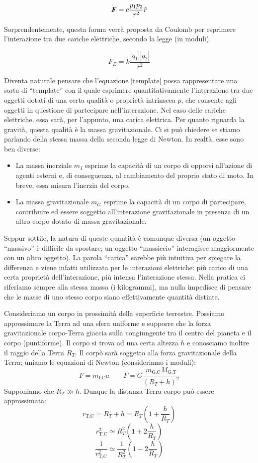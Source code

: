 \begin{align}
    \textbf{\textit{F}} = c\frac{p_1p_2}{r^2}\hat{r} \label{template}
\end{align}

\noindent Sorprendentemente, questa forma verrà proposta da Coulomb per esprimere
l'interazione tra due cariche elettriche, secondo la legge (in moduli)

\[ F_E = k\frac{|q_1||q_2|}{r^2} \]

\noindent Diventa naturale pensare che l'equazione \ref{template} possa rappresentare una
sorta di ``template'' con il quale esprimere quantitativamente l'interazione tra due
oggetti dotati di una certa qualità o proprietà intrinseca $p$, che consente agli oggetti in
questione di partecipare nell'interazione. Nel caso delle cariche elettriche,
essa sarà, per l'appunto, una carica elettrica. Per quanto riguarda la gravità,
questa qualità è la massa gravitazionale. Ci si può chiedere se stiamo parlando
della stessa massa della seconda legge di Newton. In realtà, esse sono ben diverse:
\begin{itemize}
    \item La massa inerziale $m_I$ esprime la capacità di un corpo di opporsi all'azione
    di agenti esterni e, di conseguenza, al cambiamento del proprio stato di moto.
    In breve, essa misura l'inerzia del corpo.

    \item La massa gravitazionale $m_G$ esprime la capacità di un corpo di partecipare,
    contribuire ed essere soggetto all'interazione gravitazionale in presenza di
    un altro corpo dotato di massa gravitazionale.
\end{itemize}
Seppur sottile, la natura di queste quantità è
comunque diversa (un oggetto ``massivo'' è difficile da spostare; un oggetto ``massiccio''
interagisce maggiormente con un altro oggetto). La parola ``carica'' sarebbe più intuitiva per spiegare la differenza
e viene infatti utilizzata per le interazioni elettriche: più carico di una certa
proprietà dell'interazione, più intensa l'interazione stessa. Nella pratica ci
riferiamo sempre alla stessa massa (i kilogrammi), ma nulla impedisce di pensare che le masse di
uno stesso corpo siano effettivamente quantità distinte.

Consideriamo un corpo in prossimità della superficie terrestre. Possiamo approssimare
la Terra ad una sfera uniforme e supporre che la forza gravitazionale corpo-Terra
giaccia sulla congiungente tra il centro del pianeta e il corpo (puntiforme). Il
corpo si trova ad una certa altezza $h$ e conosciamo inoltre il raggio della Terra
$R_T$. Il corpò sarà soggetto alla forza gravitazionale della Terra; uniamo le
equazioni di Newton (consideriamo i moduli):
\[ F = m_\text{I,C}a \qquad F = G\frac{m_\text{G,C}M_\text{G,T}}{(R_{T} + h)^2} \]
Supponiamo che $R_T \gg h$. Dunque la distanza Terra-corpo può essere approssimata:
\[ r_\text{T,C} = R_T + h = R_T\left(1 + \frac{h}{R_T}\right) \]
\[ r_\text{T,C}^2 \simeq R_T^2\left( 1 + 2\frac{h}{R_T} \right) \]
\[ \frac{1}{r_\text{T,C}^2} \simeq \frac{1}{R_T^2}\left( 1 - 2\frac{h}{R_T} \right) \]

